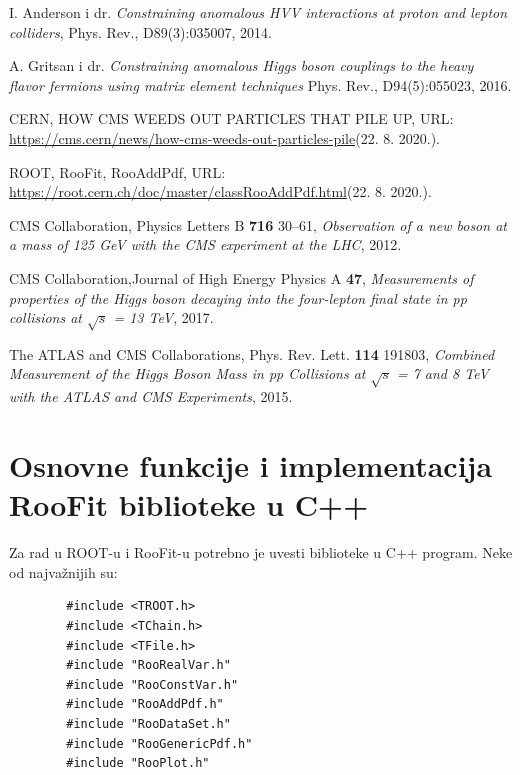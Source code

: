 \documentclass[12pt,a4paper,oneside]{article}
\begin{document}
\begin{linenumbers}
{\begin{thebibliography}{99}
				I. Anderson i dr. \textit{Constraining anomalous HVV interactions at proton and lepton
				colliders}, Phys. Rev., D89(3):035007, 2014.
				
				A. Gritsan i dr. \textit{Constraining anomalous Higgs boson couplings to the heavy
				flavor fermions using matrix element techniques} Phys. Rev., D94(5):055023,
				2016.
				
				CERN, HOW CMS WEEDS OUT PARTICLES THAT PILE UP, URL: \url{https://cms.cern/news/how-cms-weeds-out-particles-pile}(22. 8. 2020.).
				
				
				ROOT, RooFit, RooAddPdf, URL: \url{https://root.cern.ch/doc/master/classRooAddPdf.html}(22. 8. 2020.).
				
				
				CMS Collaboration, Physics Letters B \textbf{716} 30–61, \textit{Observation of a new boson at a mass of 125 GeV with the CMS experiment at
					the LHC}, 2012.
				
				CMS Collaboration,Journal of High Energy Physics A \textbf{47},  \textit{Measurements of properties of the Higgs boson decaying
					into the four-lepton final state in pp collisions at
					$\sqrt{s}$ = 13 TeV}, 2017.
				
				
				The ATLAS and CMS Collaborations, Phys. Rev. Lett. \textbf{114} 191803,  \textit{Combined Measurement
					of the Higgs Boson Mass in pp
					Collisions at $\sqrt{s}$ = 7 and 8 TeV with the ATLAS and CMS
					Experiments}, 2015.
				
				
			\end{thebibliography}
		}
		
		\newpage \appendix
		\section{Osnovne funkcije i implementacija RooFit biblioteke u  C++}
		Za rad u ROOT-u i RooFit-u potrebno je uvesti biblioteke u C++ program. Neke od najvažnijih su:
		\begin{verbatim}
		#include <TROOT.h>
		#include <TChain.h>
		#include <TFile.h>
		#include "RooRealVar.h"
		#include "RooConstVar.h"
		#include "RooAddPdf.h"
		#include "RooDataSet.h"
		#include "RooGenericPdf.h"
		#include "RooPlot.h"
		\end{verbatim}
		

\end{linenumbers}
\end{document}
